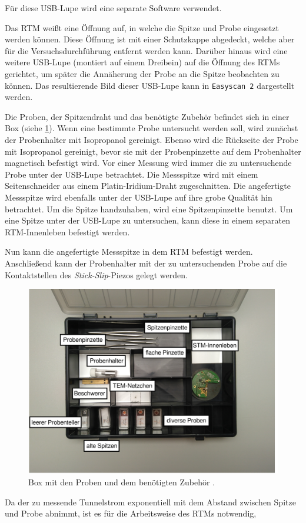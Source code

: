 Für diese USB-Lupe wird eine separate Software verwendet.\par
Das RTM weißt eine Öffnung auf, in welche die Spitze und Probe eingesetzt werden können. Diese Öffnung ist mit einer Schutzkappe abgedeckt, welche aber für
die Versuchsdurchführung entfernt werden kann. Darüber hinaus wird eine weitere USB-Lupe (montiert auf einem Dreibein) auf die Öffnung des RTMs gerichtet,
um später die Annäherung der Probe an die Spitze beobachten zu können. Das resultierende Bild dieser USB-Lupe kann in \texttt{Easyscan 2} dargestellt werden.\par
Die Proben, der Spitzendraht und das benötigte Zubehör befindet sich in einer Box (siehe \cref{fig:koffer}). Wenn eine bestimmte Probe untersucht werden soll,
wird zunächst der Probenhalter mit Isopropanol gereinigt. Ebenso wird die Rückseite der Probe mit Isopropanol gereinigt, bevor sie mit der Probenpinzette
auf dem Probenhalter magnetisch befestigt wird. Vor einer Messung wird immer die zu untersuchende Probe unter der USB-Lupe betrachtet. Die Messspitze wird mit einem
Seitenschneider aus einem Platin-Iridium-Draht zugeschnitten. Die angefertigte Messspitze wird ebenfalls unter der USB-Lupe auf ihre grobe Qualität hin betrachtet.
Um die Spitze handzuhaben, wird eine Spitzenpinzette benutzt. Um eine Spitze unter der USB-Lupe zu untersuchen, kann diese in einem separaten RTM-Innenleben befestigt werden.\par
Nun kann die angefertigte Messspitze in dem RTM befestigt werden. Anschließend kann der Probenhalter mit der zu untersuchenden Probe auf die Kontaktstellen
des \textit{Stick-Slip}-Piezos gelegt werden.
\begin{figure}[H]
	\centering
	\includegraphics[width=0.8\linewidth]{../figs/koffer.png}
	\caption{Box mit den Proben und dem benötigten Zubehör \cite{skript}.}
	\label{fig:koffer}
\end{figure} Da der zu messende Tunnelstrom exponentiell mit dem Abstand zwischen Spitze und Probe abnimmt, ist es für die Arbeitsweise des RTMs notwendig,
